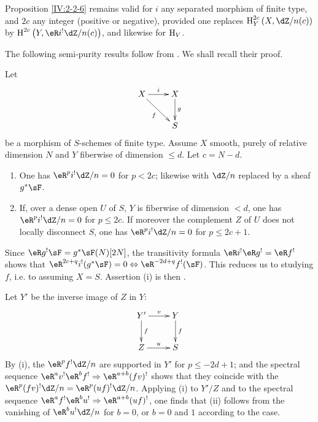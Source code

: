 Proposition \ref{IV:2-2-6} remains valid for $i$ any
separated morphism of finite type, and $2 c$ any integer (positive or negative),
provided one replaces $\h_Y^{2 c}\left(X,\dZ/n(c)\right)$ by
$\h^{2 c}\left(Y,\eR i^!\dZ/n(c)\right)$, and likewise for $\operatorname{H}_V$.

The following semi-purity results follow from
\cite[1.8, 1.10, 1.15]{sga2}. We shall recall their proof.




\begin{theorem}\label{IV:2-2-8}
Let
\[\xymatrix{
  X \ar[r]^-i \ar[dr]_-f
    & X \ar[d]^-g \\
  & S
}\]
be a morphism of $S$-schemes of finite type. Assume $X$ smooth, purely of relative dimension $N$ and $Y$ fiberwise
of dimension $\leqslant d$. Let $c=N-d$.
\begin{enumerate}[\indent (i)]
  \item One has $\eR^p i^!\dZ/n=0$ for $p<2 c$; likewise with $\dZ/n$ replaced
    by a sheaf $g^* \sF$.
  \item If, over a dense open $U$ of $S$, $Y$ is fiberwise of
    dimension $<d$, one has $\eR^p i^!\dZ/n=0$ for $p\leqslant 2 c$. If moreover the
    complement $Z$ of $U$ does not locally disconnect $S$, one has
    $\eR^pi^!\dZ/n=0$ for $p\leqslant 2 c+1$.
\end{enumerate}
\end{theorem}

Since $\eR g^! \sF=g^*\sF(N)[2N]$, the transitivity formula
$\eR i^!\eR g^!=\eR f^!$ shows that
$\eR^{2 c+q} i^!(g^*\sF)=0\Leftrightarrow \eR^{-2 d+q}f^!(\sF)$. This
reduces us to studying $f$, i.e. to assuming $X=S$. Assertion (i) is
then \cite[XVIII 3.17]{sga4}.

Let $Y'$ be the inverse image of $Z$ in $Y$:
\[\xymatrix{
  Y' \ar[r]^-v \ar[d]^-f
    & Y \ar[d]^-f \\
  Z \ar[r]^-u
    & S
}\]
By (i), the $\eR^p f^! \dZ/n$ are supported in $Y'$ for
$p\leqslant -2 d+1$; and the spectral sequence
$\eR^a v^!\eR^b f^! \Rightarrow \eR^{a+b} (f v)^!$ shows that they coincide with
the $\eR^p(f v)^!\dZ/n=\eR^p(u f)^!\dZ/n$. Applying (i) to $Y'/Z$ and to the
spectral sequence $\eR^a f^!\eR^b u^! \Rightarrow \eR^{a+b} (u f)^!$, one finds that
(ii) follows from the vanishing of $\eR^b u^! \dZ/n$ for $b=0$, or $b=0$ and $1$
according to the case.




\subsubsection{}\label{IV:2-2-9}

